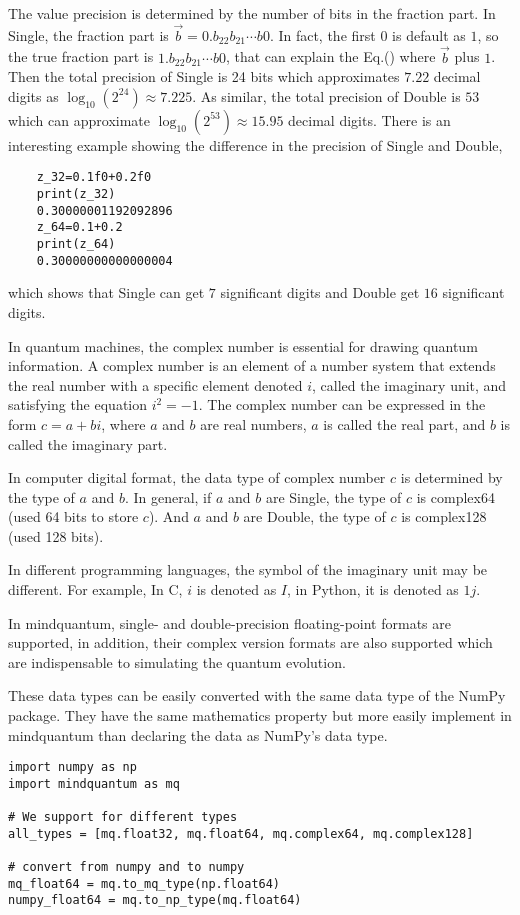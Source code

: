 The value precision is determined by the number of bits in the fraction part.
In Single, the fraction part is $\vec{b}=0.b_{22}b_{21}\cdots b{0}$.
In fact, the first $0$ is default as $1$, so the true fraction part is $1.b_{22}b_{21}\cdots b{0}$, that can explain the Eq.() where $\vec{b}$ plus $1$.
Then the total precision of Single is 24 bits which approximates $7.22$ decimal digits as $\log_{10}(2^{24}) \approx 7.225$.
As similar, the total precision of Double is $53$ which can approximate $\log_{10}(2^{53}) \approx 15.95$ decimal digits.
There is an interesting example showing the difference in the precision of Single and Double,
\begin{lstlisting}
    z_32=0.1f0+0.2f0
    print(z_32)
    0.30000001192092896
    z_64=0.1+0.2
    print(z_64)
    0.30000000000000004
\end{lstlisting}
which shows that Single can get $7$ significant digits and Double get $16$ significant digits.


In quantum machines, the complex number is essential for drawing quantum information. A complex number is an element of a number system that extends the real number with a specific element denoted $i$, called the imaginary unit, and satisfying the equation $i^2=-1$.
The complex number can be expressed in the form $c=a+bi$, where $a$ and $b$ are real numbers, $a$ is called the real part, and $b$ is called the imaginary part.

In computer digital format, the data type of complex number $c$ is determined by the type of $a$ and $b$.
In general, if $a$ and $b$ are Single, the type of $c$ is complex64 (used 64 bits to store $c$). And $a$ and $b$ are Double, the type of $c$ is complex128 (used 128 bits).

In different programming languages, the symbol of the imaginary unit may be different.
For example, In C, $i$ is denoted as $I$, in Python, it is denoted as $1j$.

In mindquantum, single- and double-precision floating-point formats are supported, in addition, their complex version formats are also supported which are indispensable to simulating the quantum evolution.

These data types can be easily converted with the same data type of the NumPy package. They have the same mathematics property but more easily implement in mindquantum than declaring the data as NumPy's data type.
\begin{lstlisting}
import numpy as np
import mindquantum as mq

# We support for different types
all_types = [mq.float32, mq.float64, mq.complex64, mq.complex128]

# convert from numpy and to numpy
mq_float64 = mq.to_mq_type(np.float64)
numpy_float64 = mq.to_np_type(mq.float64)
\end{lstlisting}

